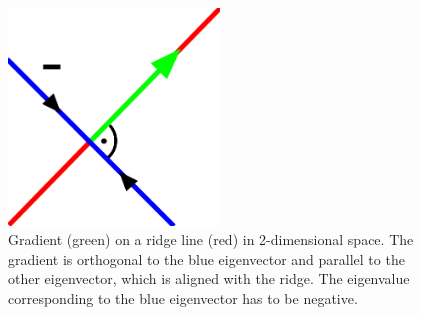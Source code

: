 \begin{figure}
  \centering
  \includegraphics[width=0.5\textwidth]{Images/ridgeEV.pdf}
  \caption{Gradient (green) on a ridge line (red) in 2-dimensional space.
  The gradient is orthogonal to the blue eigenvector and parallel to the
  other eigenvector, which is aligned with the ridge. The eigenvalue
  corresponding to the blue eigenvector has to be negative.}
  \label{fig:ridgeEV}
\end{figure}

